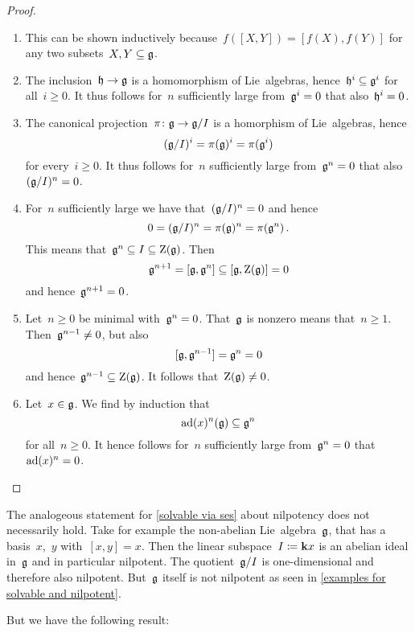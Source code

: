 \begin{proof}
  \leavevmode
  \begin{enumerate}
    \item
      This can be shown inductively because~$f([X,Y]) = [f(X), f(Y)]$ for any two subsets~$X, Y \subseteq \mathfrak{g}$.
    \item
      The inclusion~$\mathfrak{h} \to \mathfrak{g}$ is a homomorphism of Lie~algebras, hence~$\mathfrak{h}^i \subseteq \mathfrak{g}^i$ for all~$i \geq 0$.
      It thus follows for~$n$ sufficiently large from~$\mathfrak{g}^i = 0$ that also~$\mathfrak{h}^i = 0$.
    \item
      The canonical projection~$\pi \colon \mathfrak{g} \to \mathfrak{g}/I$ is a homorphism of Lie~algebras, hence
      \[
        (\mathfrak{g}/I)^i
        =
        \pi(\mathfrak{g})^i
        =
        \pi(\mathfrak{g}^i)
      \]
      for every~$i \geq 0$.
      It thus follows for~$n$ sufficiently large from~$\mathfrak{g}^n = 0$ that also~$(\mathfrak{g}/I)^n = 0$.
    \item
      For~$n$ sufficiently large we have that~$(\mathfrak{g}/I)^n = 0$ and hence
      \[
        0
        =
        (\mathfrak{g}/I)^n
        =
        \pi(\mathfrak{g})^n
        =
        \pi(\mathfrak{g}^n)  \,.
      \]
      This means that~$\mathfrak{g}^n \subseteq I \subseteq \operatorname{Z}(\mathfrak{g})$.
      Then
      \[
        \mathfrak{g}^{n+1}
        =
        [\mathfrak{g}, \mathfrak{g}^n]
        \subseteq
        [\mathfrak{g}, \operatorname{Z}(\mathfrak{g})]
        =
        0
      \]
      and hence~$\mathfrak{g}^{n+1} = 0$.
    \item
      Let~$n \geq 0$ be minimal with~$\mathfrak{g}^n = 0$.
      That~$\mathfrak{g}$ is nonzero means that~$n \geq 1$.
      Then~$\mathfrak{g}^{n-1} \neq 0$, but also
      \[
        [\mathfrak{g}, \mathfrak{g}^{n-1}]
        =
        \mathfrak{g}^n
        =
        0
      \]
      and hence~$\mathfrak{g}^{n-1} \subseteq \operatorname{Z}(\mathfrak{g})$.
      It follows that~$\operatorname{Z}(\mathfrak{g}) \neq 0$.
    \item
      Let~$x \in \mathfrak{g}$.
      We find by induction that
      \[
        \operatorname{ad}(x)^n(\mathfrak{g})
        \subseteq
        \mathfrak{g}^n
      \]
      for all~$n \geq 0$.
      It hence follows for~$n$ sufficiently large from~$\mathfrak{g}^n = 0$ that~$\operatorname{ad}(x)^n = 0$.
    \qedhere
  \end{enumerate}
\end{proof}


\begin{remark}
  The analogeous statement for \cref{solvable via ses} about nilpotency does not necessarily hold.
  Take for example the {\twodimensional} non-abelian Lie~algebra~$\mathfrak{g}$, that has a basis~$x$,~$y$ with~$[x,y] = x$.
  Then the {\onedimensional} linear subspace~$I \coloneqq \mathbf{k} x$ is an abelian ideal in~$\mathfrak{g}$ and in particular nilpotent.
  The quotient~$\mathfrak{g}/I$ is one-dimensional and therefore also nilpotent.
  But~$\mathfrak{g}$ itself is not nilpotent as seen in \cref{examples for solvable and nilpotent}.
  
  But we have the following result:
\end{remark}


